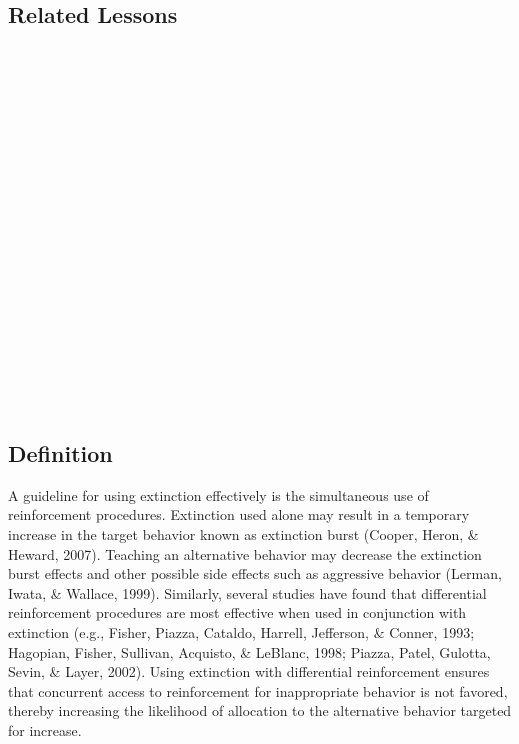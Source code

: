 \subsection{Related Lessons}
\fourcOne{}\\
\fourdTwo{}\\
\fourdSixteen{}\\
\fourdSeventeen{}\\
\fourdNineteen{}\\
\fourdTwenty{}\\
\fourdTwentyOne{}\\
\foureTen{}\\
\foureEleven{}\\
\fourfTwo{}\\
\fourFKFourteen{}\\
\fourFKFifteen{}\\
\fourFKSeventeen{}\\
\fourFKEighteen{}\\
\fourFKNineteen{}\\
\fourFKTwenty{}\\
\fourFKTwentyOne{}\\
\fourFKTwentyThree{}\\
%
\clearpage \section[\fourdNineteen{}]{\fourdNineteen{}%
              }
\subsection{Definition}
A guideline for using extinction effectively is the simultaneous use of reinforcement procedures. Extinction used alone may result in a temporary increase in the target behavior known as extinction burst (Cooper, Heron, \& Heward, 2007). Teaching an alternative behavior may decrease the extinction burst effects and other possible side effects such as aggressive behavior (Lerman, Iwata, \& Wallace, 1999). Similarly, several studies have found that differential reinforcement procedures are most effective when used in conjunction with extinction (e.g., Fisher, Piazza, Cataldo, Harrell, Jefferson, \& Conner, 1993; Hagopian, Fisher, Sullivan, Acquisto, \& LeBlanc, 1998; Piazza, Patel, Gulotta, Sevin, \& Layer, 2002).  Using extinction with differential reinforcement ensures that concurrent access to reinforcement for inappropriate behavior is not favored, thereby increasing the likelihood of allocation to the alternative behavior targeted for increase.


